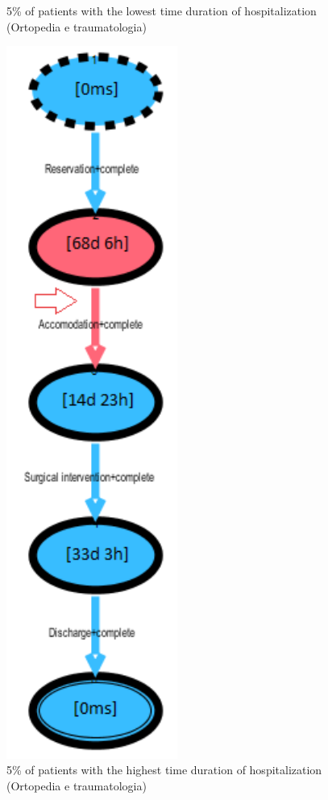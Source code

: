 \begin{figure} [htbp]
\begin{minipage}[t]{0.3\textwidth}
\caption{5\% of patients with the lowest time duration of hospitalization (Ortopedia e traumatologia)}
\end{minipage}
\begin{minipage}[t]{0.3\textwidth}
\includegraphics[width=0.5\textwidth]{RicoveriTransitionSystemSojourn3601Slow}
\caption{5\% of patients with the highest time duration of hospitalization (Ortopedia e traumatologia)}
\end{minipage}
\end{figure}\\
